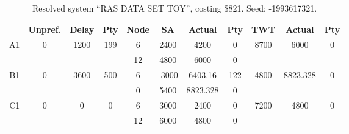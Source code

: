 \begin{sidewaystable}
\footnotesize
\caption{Resolved system ``RAS DATA SET TOY'', costing \$821. Seed: -1993617321.}
\centering
\begin{tabular}{c||c|c|c||c|c|c|c||c|c|c}
  \hline \hline
  &
  Unpref. & 
  Delay &
  Pty &
  Node &
  SA &
  Actual &
  Pty &
  TWT &
  Actual &
  Pty \\
      \hline
      \multirow{2}{*}{A1} &
      \multirow{2}{*}{0} &
      \multirow{2}{*}{1200} &
      \multirow{2}{*}{199} &
      6 &
      2400 &
        4200 &
        0 &
      \multirow{2}{*}{8700} &
        \multirow{2}{*}{6000} &
        \multirow{2}{*}{0}
      \\
      \cline{5-8}
       &
       &
       &
       &
      12 &
      4800 &
        6000 &
        0 &
      
         &
        
      \\
      \hline
      \multirow{2}{*}{B1} &
      \multirow{2}{*}{0} &
      \multirow{2}{*}{3600} &
      \multirow{2}{*}{500} &
      6 &
      -3000 &
        6403.16 &
        122 &
      \multirow{2}{*}{4800} &
        \multirow{2}{*}{8823.328} &
        \multirow{2}{*}{0}
      \\
      \cline{5-8}
       &
       &
       &
       &
      0 &
      5400 &
        8823.328 &
        0 &
      
         &
        
      \\
      \hline
      \multirow{2}{*}{C1} &
      \multirow{2}{*}{0} &
      \multirow{2}{*}{0} &
      \multirow{2}{*}{0} &
      6 &
      3000 &
        2400 &
        0 &
      \multirow{2}{*}{7200} &
        \multirow{2}{*}{4800} &
        \multirow{2}{*}{0}
      \\
      \cline{5-8}
       &
       &
       &
       &
      12 &
      6000 &
        4800 &
        0 &
      
         &
        
      \\
\end{tabular}
\label{table:RASDATASETTOY} 
\end{sidewaystable}